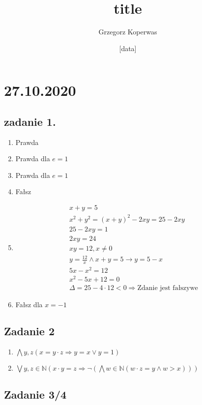 \documentclass[a4paper,12pt]{article}
\title{title}
\author{Grzegorz Koperwas}
\date{[data]}
\begin{document}
	\section{27.10.2020}

	\subsection{zadanie 1.}
	\begin{enumerate}
		\item Prawda
		\item Prawda dla $e = 1$
		\item Prawda dla $e = 1$
		\item Fałsz
		\item \begin{gather*}
			x + y = 5 \\
			x^2 + y^2 = (x + y)^2 - 2xy = 25 - 2xy\\
			25 - 2xy = 1\\
			2xy = 24 \\
			xy = 12, x \not = 0 \\
			y = \frac{12}{x} \wedge x + y = 5 \rightarrow y = 5 -x\\
			5x - x^2 = 12\\
			x^2 -5x + 12 =0 \\
			\Delta = 25 - 4 \cdot 12 < 0 \Rightarrow \text{Zdanie jest fałszywe}
		\end{gather*}
		\item Fałsz dla $x= -1$
	\end{enumerate}

	\subsection{Zadanie 2}
	\begin{enumerate}
		\item $\bigwedge y, z \left(x = y \cdot z \Rightarrow y = x \vee y = 1\right)$
		\item $\bigvee y, z \in \mathbb{N} \left(x \cdot y = z \Rightarrow \neg \left(\bigwedge w \in \mathbb{N} \left(w \cdot z = y \wedge w > x\right)\right)\right)$
	\end{enumerate}

	\subsection{Zadanie 3/4}

	
\end{document}
